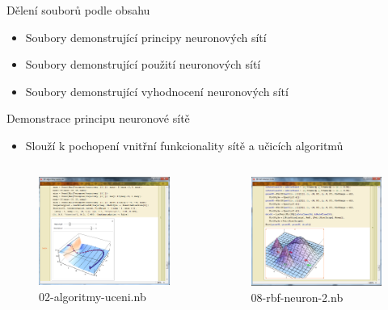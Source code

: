 \documentclass{beamer}
\begin{document}
\begin{frame}{Dělení souborů podle obsahu}
\begin{itemize}
\item Soubory demonstrující principy neuronových sítí
\item Soubory demonstrující použití neuronových sítí
\item Soubory demonstrující vyhodnocení neuronových sítí
\end{itemize}
\end{frame}
\begin{frame}{Demonstrace principu neuronové sítě}
\begin{itemize}
\item Slouží k pochopení vnitřní funkcionality sítě a učicích algoritmů
\end{itemize} 
  \begin{columns}[T]
    \column{5cm}
      \begin{figure}
     
   \includegraphics[width=5.5cm]{uk1.png}
    \caption{02-algoritmy-uceni.nb}
   
\end{figure}
    \column{5cm}
      \begin{figure}
   
   \includegraphics[width=5.5cm]{uk2.png}
      \caption{08-rbf-neuron-2.nb}
\end{figure}
  \end{columns}
\end{frame}
\end{document}
